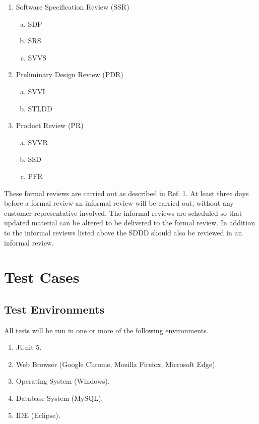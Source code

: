\documentclass{article}
\begin{document}
\begin{enumerate}
	\item Software Specification Review (SSR)
		\begin{enumerate}[a.] 
			\item SDP
			\item SRS 
			\item SVVS 
		\end{enumerate}
	\item Preliminary Design Review (PDR) 
		\begin{enumerate}[a.]
			\item SVVI
			\item STLDD
		\end{enumerate}
	\item Product Review (PR) 
		\begin{enumerate}[a.]
			\item SVVR 
			\item SSD 
			\item PFR 
		\end{enumerate}
\end{enumerate}

\noindent
These formal reviews are carried out as described in Ref. 1. At least three days before a formal review an informal review will be carried out, without any customer representative involved. The informal reviews are scheduled so that updated material can be altered to be delivered to the formal review. In addition to the informal reviews listed above the SDDD should also be reviewed in an informal review. 

\section{Test Cases}
	\subsection{Test Environments}
	All tests will be run in one or more of the following environments. 
		\begin{enumerate}
			\item JUnit 5.

			\item Web Browser (Google Chrome, Mozilla Firefox, Microsoft Edge).

			\item Operating System (Windows).

			\item Database System (MySQL).

			\item IDE (Eclipse).	
		\end{enumerate}
		
\end{document}
